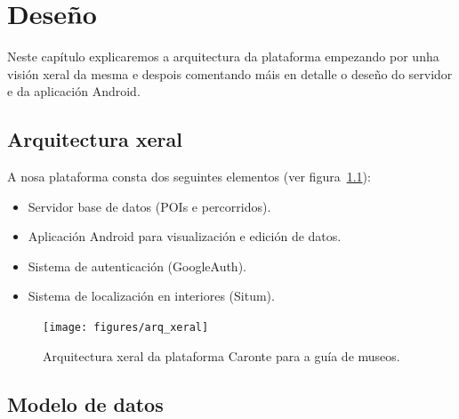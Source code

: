 \chapter{Deseño}

Neste capítulo explicaremos a arquitectura da plataforma empezando por unha visión xeral da mesma e despois comentando máis en detalle o deseño do servidor e da aplicación Android.



\section{Arquitectura xeral}

A nosa plataforma consta dos seguintes elementos (ver figura~\ref{fig:arq_xeral}):
\begin{itemize}
 \item Servidor base de datos (POIs e percorridos).
 \item  Aplicación Android para visualización e edición de datos.
 \item Sistema de autenticación (GoogleAuth).
  \item Sistema de localización en interiores (Situm).
\end{itemize}


\begin{figure}[tb] 
	\begin{center}
		\texttt{[image: figures/arq\_xeral]}
		\caption{Arquitectura xeral da plataforma Caronte para a guía de museos.}
		\label{fig:arq_xeral}
	\end{center}
\end{figure}



\section{Modelo de datos}


